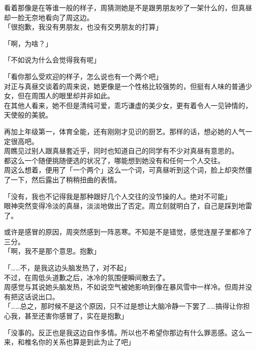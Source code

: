看着那像是在等谁一般的样子，周猜测她是不是跟男朋友吵了一架什么的，但真昼却一脸无奈地看向了周这边。\\

「很抱歉，我没有男朋友，也没有交男朋友的打算」

「啊，为啥？」

「不如说为什么会觉得我有呢」

「看你那么受欢迎的样子，怎么说也有一个两个吧」\\

对正与真昼交谈着的周来说，她更像是一个性格比较强势的，但挺有人味的普通少女，但在周围人的眼里却并非如此。\\

在其他人看来，她不但是清纯可爱，乖巧谦虚的美少女，更有着令人一见钟情的，天使般的美貌。

再加上年级第一，体育全能，还有刚刚才见识的厨艺。那样的话，想必她的人气一定很高吧。\\

周瞧见过别人跟真昼套近乎，同时也知道自己的同学有不少对真昼有意思的。\\

都这么一个随便挑随便选的状况了，哪能想到她没有和任何一个人交往。\\

周这么想着，便用了「一个两个」这么一个词，可真昼听到这个词，脸上却突然僵了一下，然后露出了稍稍扭曲的表情。

「没有，我也不记得我是那种跟好几个人交往的没节操的人。绝对不可能」\\

眼神突然变得冷淡的真昼，淡淡地做出了否定。周立刻就明白了，自己是踩到地雷了。

或许是感冒的原因，周突然感到一阵恶寒。不知是不是错觉，感觉连屋子里都冷了三分。\\

「啊，我不是那个意思。抱歉」

「……不，是我这边头脑发热了，对不起」\\

不过，在周低头道歉之后，冰冷的氛围便瞬间散去了。\\

周感觉与其说她头脑发热，不如说空气被她影响到像在暴风雪中一样冷。但周并没有把这话说出口。\\

「……总之，那时候不是这个原因，只不过是想让大脑冷静一下罢了……搞得让你担心我，甚至还害你感冒了，实在是抱歉」

「没事的。反正也是我这边自作多情。所以也不希望你那边有什么罪恶感。这么一来，和椎名你的关系也算是到此为止了吧」\\


